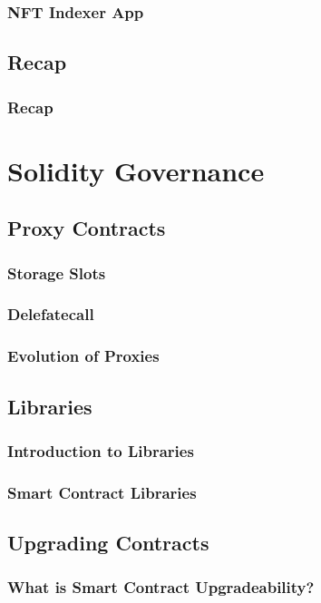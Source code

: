 \documentclass[a4paper, oneside]{book}
\begin{document}
\subsection{NFT Indexer App}

\section{Recap}
\subsection{Recap}


\chapter{Solidity Governance}


\section{Proxy Contracts}
\subsection{Storage Slots}
\subsection{Delefatecall}
\subsection{Evolution of Proxies}

\section{Libraries}
\subsection{Introduction to Libraries}
\subsection{Smart Contract Libraries}

\section{Upgrading Contracts}
\subsection{What is Smart Contract Upgradeability?}
\end{document}
